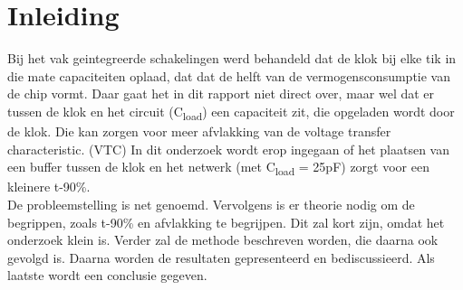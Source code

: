 \documentclass{report}
\begin{document}
\newcommand{\rp}{$\rightarrow$}
\newcommand{\Ohm}{$\Omega$}
\newcommand{\ohm}{$\omega$}
\newcommand{\gmu}{$\mu$}
\newcommand{\tss}{\textsubscript}
\newcommand{\ci}{} %


\tableofcontents
\chapter{Inleiding}
Bij het vak geintegreerde schakelingen werd behandeld dat de klok bij elke tik in die mate capaciteiten oplaad, dat dat de helft van de vermogensconsumptie van de chip vormt. Daar gaat het in dit rapport niet direct over, maar wel dat er tussen de klok en het circuit (C\tss{load}) een capaciteit zit, die opgeladen wordt door de klok. Die kan zorgen voor meer afvlakking van de voltage transfer characteristic. (VTC) In dit onderzoek wordt erop ingegaan of het plaatsen van een buffer tussen de klok en het netwerk (met C\tss{load} = 25pF) zorgt voor een kleinere t-90\%. \newline \\
De probleemstelling is net genoemd. Vervolgens is er theorie nodig om de begrippen, zoals t-90\% en afvlakking te begrijpen. Dit zal kort zijn, omdat het onderzoek klein is. Verder zal de methode beschreven worden, die daarna ook gevolgd is. Daarna worden de resultaten gepresenteerd en bediscussieerd. Als laatste wordt een conclusie gegeven. 
\end{document}
